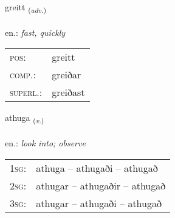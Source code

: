 \documentclass[frontgrid, backgrid]{flacards}\usepackage[]{graphicx}\usepackage[]{xcolor}
\begin{document}
\renewcommand{\flhead}{\vskip5pt \fboxsep=0pt {\small\bfseries\footnotesize Atviksorð | Adverb}}
\renewcommand{\fcfoot}{\vskip5pt \fboxsep=0pt \hspace{2pt}{\small\bfseries\footnotesize 2K}}

\renewcommand{\blhead}{\vskip5pt {\small\bfseries\footnotesize Atviksorð | Adverb }}
\renewcommand{\bcfoot}{\vskip5pt \hspace{2pt}{\small\bfseries\footnotesize 2K}}


{greitt \small{\textsubscript{(\textit{adv.})}} \\[1ex] %
\textphonetic{[kreiht]} \\
en.: \emph{fast, quickly} \\  [2ex]
\renewcommand*{\arraystretch}{0.8}
\begin{tabular}{ll}
\textsc{pos}: & greitt \\ 
\textsc{comp.}: & greiðar \\ 
\textsc{superl.}: & greiðast \\
\end{tabular}
}

\renewcommand{\flhead}{\vskip5pt \fboxsep=0pt {\small\bfseries\footnotesize Sagnorð | Verb}}
\renewcommand{\fcfoot}{\vskip5pt \fboxsep=0pt \hspace{2pt}{\small\bfseries\footnotesize 2K}}

\renewcommand{\blhead}{\vskip5pt {\small\bfseries\footnotesize Sagnorð | Verb }}
\renewcommand{\bcfoot}{\vskip5pt \hspace{2pt}{\small\bfseries\footnotesize 2K}}


{athuga \small{\textsubscript{(\textit{v.})}} \\[1ex] %
\textphonetic{[aːthʏɣa]} \\
en.: \emph{look into; observe} \\  [2ex]
\renewcommand*{\arraystretch}{0.8}
\begin{tabular}{p{1cm}l}
\textsc{1sg}: & athuga -- athugaði -- athugað \\ 
\textsc{2sg}: & athugar -- athugaðir -- athugað \\ 
\textsc{3sg}: & athugar -- athugaði -- athugað \\ 
\end{tabular}
}
\end{document}
